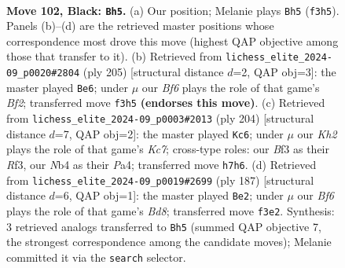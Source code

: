 \documentclass[11pt]{article}
\begin{document}
\clearpage

\begin{figure}[p]\centering
\begin{subfigure}{0.46\textwidth}\centering
\resizebox{\linewidth}{!}{%
\newchessgame
\chessboard[
  setfen={8/7k/8/8/1n1B4/5b1K/5P2/8 b - - 50 102},
  showmover=false,
  pgfstyle=straightmove, color=movearrow, markmove={f3-h5}
]}
\caption{}
\end{subfigure}\hfill
\begin{subfigure}{0.46\textwidth}\centering
\resizebox{\linewidth}{!}{%
\newchessgame
\chessboard[
  setfen={8/5b2/5P2/8/3B4/8/3k4/1K6 b - - 20 103},
  showmover=false,
  pgfstyle=straightmove, color=movearrow, markmove={f7-e6}
]}
\caption{}
\end{subfigure}
\\[4pt]
\begin{subfigure}{0.46\textwidth}\centering
\resizebox{\linewidth}{!}{%
\newchessgame
\chessboard[
  setfen={8/2K5/4k3/p7/P7/5R2/3b4/8 w - - 68 103},
  showmover=false,
  pgfstyle=straightmove, color=movearrow, markmove={c7-c6}
]}
\caption{}
\end{subfigure}\hfill
\begin{subfigure}{0.46\textwidth}\centering
\resizebox{\linewidth}{!}{%
\newchessgame
\chessboard[
  setfen={6B1/8/8/8/3k4/P7/1K6/3b4 b - - 10 94},
  showmover=false,
  pgfstyle=straightmove, color=movearrow, markmove={d1-e2}
]}
\caption{}
\end{subfigure}
\caption{\textbf{Move 102, Black: \texttt{Bh5}.} (a) Our position; Melanie plays \texttt{Bh5} (\texttt{f3h5}). Panels (b)--(d) are the retrieved master positions whose correspondence most drove this move (highest QAP objective among those that transfer to it). (b) Retrieved from \texttt{lichess\_elite\_2024-09\_p0020\#2804} (ply 205) [structural distance $d$=2, QAP obj=3]: the master played \texttt{Be6}; under $\mu$ our \emph{Bf6} plays the role of that game's \emph{Bf2}; transferred move \texttt{f3h5} \textbf{(endorses this move)}. (c) Retrieved from \texttt{lichess\_elite\_2024-09\_p0003\#2013} (ply 204) [structural distance $d$=7, QAP obj=2]: the master played \texttt{Kc6}; under $\mu$ our \emph{Kh2} plays the role of that game's \emph{Kc7}; cross-type roles: our \emph{B}f3 as their \emph{R}f3, our \emph{N}b4 as their \emph{P}a4; transferred move \texttt{h7h6}. (d) Retrieved from \texttt{lichess\_elite\_2024-09\_p0019\#2699} (ply 187) [structural distance $d$=6, QAP obj=1]: the master played \texttt{Be2}; under $\mu$ our \emph{Bf6} plays the role of that game's \emph{Bd8}; transferred move \texttt{f3e2}. Synthesis: 3 retrieved analogs transferred to \texttt{Bh5} (summed QAP objective 7, the strongest correspondence among the candidate moves); Melanie committed it via the \texttt{search} selector.}
\label{fig:thought-m203}
\end{figure}
\end{document}
